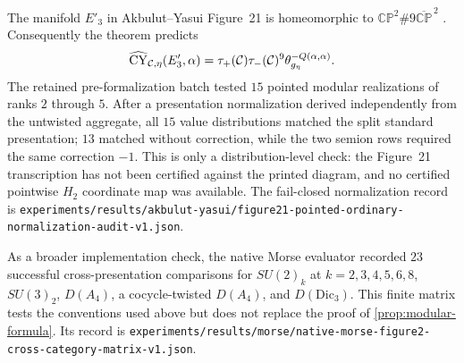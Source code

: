 \begin{example}
\label{ex:figure21-pointed}
The manifold $E'_3$ in Akbulut--Yasui Figure~21 is homeomorphic to
$\mathbb{CP}^2\#9\overline{\mathbb{CP}}^{\,2}$
\cite[Section~6, Theorem~6.1 and Figure~21]{AkbulutYasui2008}.  Consequently
the theorem predicts
\[
 \widehat{\operatorname{CY}}_{\mathcal{C},\eta}(E'_3,\alpha)
 =\tau_+(\mathcal{C})\tau_-(\mathcal{C})^9
  \theta_{g_\eta}^{-Q(\alpha,\alpha)}.
\]
The retained pre-formalization batch tested $15$ pointed modular
realizations of ranks $2$ through $5$.  After a presentation normalization
derived independently from the untwisted aggregate, all $15$ value
distributions matched the split standard presentation; $13$ matched without
correction, while the two semion rows required the same correction $-1$.
This is only a distribution-level check: the Figure~21 transcription has not
been certified against the printed diagram, and no certified pointwise
$H_2$ coordinate map was available.  The fail-closed normalization record is
\nolinkurl{experiments/results/akbulut-yasui/figure21-pointed-ordinary-normalization-audit-v1.json}.
\end{example}

As a broader implementation check, the native Morse evaluator recorded
$23$ successful cross-presentation comparisons for
$SU(2)_k$ at $k=2,3,4,5,6,8$, $SU(3)_2$, $D(A_4)$, a cocycle-twisted
$D(A_4)$, and $D(\mathrm{Dic}_3)$.  This finite matrix tests the conventions
used above but does not replace the proof of \cref{prop:modular-formula}.  Its
record is
\nolinkurl{experiments/results/morse/native-morse-figure2-cross-category-matrix-v1.json}.
